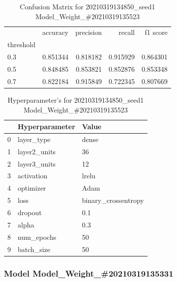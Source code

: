         \begin{table}
\centering
\caption{Confusion Matrix for 20210319134850\_seed1 Model\_Weight\_\#20210319135523}
\label{tab:conf_matr20210319134850seed1ModelWeight20210319135523}
\begin{tabular}{lrrrr}
\toprule
{} &  accuracy &  precision &    recall &  f1 score \\
threshold &           &            &           &           \\
\midrule
0.3       &  0.851344 &   0.818182 &  0.915929 &  0.864301 \\
0.5       &  0.848485 &   0.853821 &  0.852876 &  0.853348 \\
0.7       &  0.822184 &   0.915849 &  0.722345 &  0.807669 \\
\bottomrule
\end{tabular}
\end{table}
\begin{table}
\centering
\caption{Hyperparameter's for 20210319134850\_seed1 Model\_Weight\_\#20210319135523}
\label{tab:hyp20210319134850seed1ModelWeight20210319135523}
\begin{tabular}{lll}
\toprule
{} & Hyperparameter &                Value \\
\midrule
0 &     layer\_type &                dense \\
1 &   layer2\_units &                   36 \\
2 &   layer3\_units &                   12 \\
3 &     activation &                lrelu \\
4 &      optimizer &                 Adam \\
5 &           loss &  binary\_crossentropy \\
6 &        dropout &                  0.1 \\
7 &          alpha &                  0.3 \\
8 &     num\_epochs &                   50 \\
9 &     batch\_size &                   50 \\
\bottomrule
\end{tabular}
\end{table}
\subsubsection{Model Model\_Weight\_\#20210319135331}

